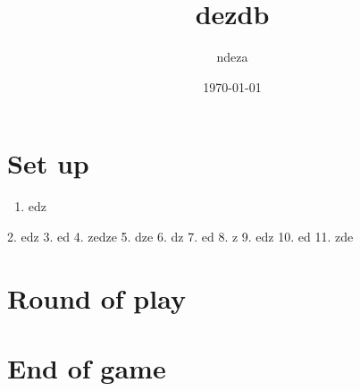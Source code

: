 \documentclass{article}%
\title{dezdb}%
\author{ndeza}%
\date{\today}%
\begin{document}
%
\pagestyle{empty}%
\normalsize%
\maketitle%
\section{ Set up
}%
\label{sec:Setup}%
\begin{enumerate}%
\item%
 edz
%
\end{enumerate}%
2. edz
%
3. ed
%
4. zedze
%
5. dze
%
6. dz
%
7. ed
%
8. z
%
9. edz
%
10. ed
%
11. zde


%
\section{ Round of play
}%
\label{sec:Roundofplay}%

%
\section{ End of game}%
\label{sec:Endofgame}%

%
\end{document}
